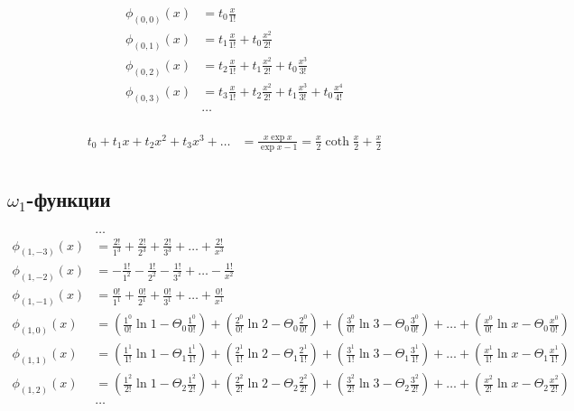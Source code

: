 \begin{equation*} \begin{aligned}
\phi_{(0,0)}(x) &= 
  t_0 \frac{x}{1!} 
\\
\phi_{(0,1)}(x) &= 
  t_1 \frac{x}{1!} 
+ t_0 \frac{x^2}{2!} 
\\
\phi_{(0,2)}(x) &= 
  t_2 \frac{x}{1!} 
+ t_1 \frac{x^2}{2!} 
+ t_0 \frac{x^3}{3!} 
\\
\phi_{(0,3)}(x) &= 
  t_3 \frac{x}{1!} 
+ t_2 \frac{x^2}{2!} 
+ t_1 \frac{x^3}{3!} 
+ t_0 \frac{x^4}{4!} 
\\
&\ldots
\\
\end{aligned} \end{equation*}

\begin{equation*} \begin{aligned}
  t_0
+ t_1 x
+ t_2 x^2
+ t_3 x^3
+ \ldots
&
= \frac{x \exp{x}}{\exp{x} - 1}
= \frac{x}{2} \coth{\frac{x}{2}} 
+ \frac{x}{2}
\\
\end{aligned} \end{equation*}

\subsection{$\omega_1$-функции}

\begin{equation*} \begin{aligned}
&\ldots
\\
\phi_{(1,-3)}(x) &=
  \frac{2!}{1^3}
+ \frac{2!}{2^3} 
+ \frac{2!}{3^3} 
+ \ldots 
+ \frac{2!}{x^3}
\\
\phi_{(1,-2)}(x) &=
- \frac{1!}{1^2}
- \frac{1!}{2^2} 
- \frac{1!}{3^2} 
+ \ldots 
- \frac{1!}{x^2}
\\
\phi_{(1,-1)}(x) &=
  \frac{0!}{1^1}
+ \frac{0!}{2^1} 
+ \frac{0!}{3^1} 
+ \ldots 
+ \frac{0!}{x^1}
\\
\phi_{(1,0)}(x) &=
  \left( \frac{1^0}{0!} \ln{1} - \Theta_0 \frac{1^0}{0!} \right)
+ \left( \frac{2^0}{0!} \ln{2} - \Theta_0 \frac{2^0}{0!} \right) 
+ \left( \frac{3^0}{0!} \ln{3} - \Theta_0 \frac{3^0}{0!} \right) 
+ \ldots 
+ \left( \frac{x^0}{0!} \ln{x} - \Theta_0 \frac{x^0}{0!} \right)
\\
\phi_{(1,1)}(x) &=
  \left(\frac{1^1}{1!} \ln{1} - \Theta_1 \frac{1^1}{1!} \right)
+ \left( \frac{2^1}{1!} \ln{2} - \Theta_1 \frac{2^1}{1!} \right) 
+ \left( \frac{3^1}{1!} \ln{3} - \Theta_1 \frac{3^1}{1!} \right) 
+ \ldots 
+ \left( \frac{x^1}{1!} \ln{x} - \Theta_1 \frac{x^1}{1!} \right)
\\
\phi_{(1,2)}(x) &=
  \left( \frac{1^2}{2!} \ln{1} - \Theta_2 \frac{1^2}{2!} \right)
+ \left( \frac{2^2}{2!} \ln{2} - \Theta_2 \frac{2^2}{2!} \right) 
+ \left( \frac{3^2}{2!} \ln{3} - \Theta_2 \frac{3^2}{2!} \right) 
+ \ldots 
+ \left( \frac{x^2}{2!} \ln{x} - \Theta_2 \frac{x^2}{2!} \right)
\\
&\ldots
\\
\end{aligned} \end{equation*}

